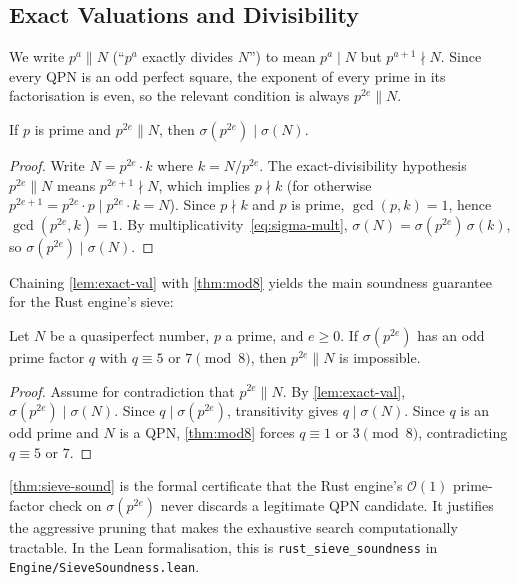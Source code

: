 \subsection{Exact Valuations and Divisibility}
\label{subsec:exact_valuations}

We write $p^{a} \parallel N$ (``$p^{a}$ exactly divides $N$'') to mean
$p^{a} \mid N$ but $p^{a+1} \nmid N$.
Since every QPN is an odd perfect square, the exponent of every prime in
its factorisation is even, so the relevant condition is always
$p^{2e} \parallel N$.

\begin{lemma}\label{lem:exact-val}
If $p$ is prime and $p^{2e} \parallel N$, then
$\sigma(p^{2e}) \mid \sigma(N)$.
\end{lemma}

\begin{proof}
Write $N = p^{2e} \cdot k$ where $k = N / p^{2e}$.  The exact-divisibility
hypothesis $p^{2e} \parallel N$ means $p^{2e+1} \nmid N$, which implies
$p \nmid k$ (for otherwise $p^{2e+1} = p^{2e} \cdot p \mid p^{2e} \cdot k = N$).
Since $p \nmid k$ and $p$ is prime, $\gcd(p, k)=1$, hence $\gcd(p^{2e},k)=1$.
By multiplicativity~\eqref{eq:sigma-mult}, $\sigma(N) = \sigma(p^{2e})\,\sigma(k)$,
so $\sigma(p^{2e}) \mid \sigma(N)$.
\end{proof}

Chaining \cref{lem:exact-val} with \cref{thm:mod8} yields the main soundness
guarantee for the Rust engine's sieve:

\begin{theorem}\label{thm:sieve-sound}
Let $N$ be a quasiperfect number, $p$ a prime, and $e \ge 0$.
If $\sigma(p^{2e})$ has an odd prime factor $q$ with
$q \equiv 5$ or $7 \pmod{8}$, then $p^{2e} \parallel N$ is impossible.
\end{theorem}

\begin{proof}
Assume for contradiction that $p^{2e} \parallel N$.
By \cref{lem:exact-val}, $\sigma(p^{2e}) \mid \sigma(N)$.
Since $q \mid \sigma(p^{2e})$, transitivity gives $q \mid \sigma(N)$.
Since $q$ is an odd prime and $N$ is a QPN, \cref{thm:mod8} forces
$q \equiv 1$ or $3 \pmod{8}$, contradicting $q \equiv 5$ or $7$.
\end{proof}

\cref{thm:sieve-sound} is the formal certificate that the Rust engine's
$\mathcal{O}(1)$ prime-factor check on $\sigma(p^{2e})$ never discards a
legitimate QPN candidate.  It justifies the aggressive pruning that makes
the exhaustive search computationally tractable.  In the Lean formalisation,
this is \texttt{rust\_\allowbreak{}sieve\_\allowbreak{}soundness} in
\texttt{Engine/SieveSoundness.lean}.


